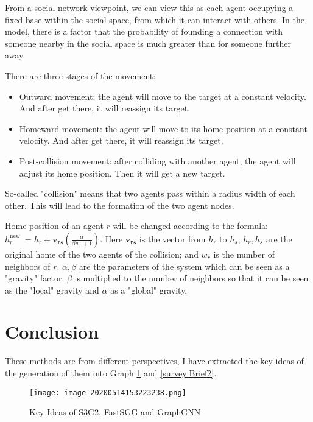 \begin{survey}
From a social network viewpoint, we can view this as each agent
occupying a fixed base within the social space, from which it can
interact with others. In the model, there is a factor that the
probability of founding a connection with someone nearby in the social
space is much greater than for someone further away.

There are three stages of the movement:

\begin{itemize}
\item
  Outward movement: the agent will move to the target at a constant
  velocity. And after get there, it will reassign its target.
\item
  Homeward movement: the agent will move to its home position at a
  constant velocity. And after get there, it will reassign its target.
\item
  Post-collision movement: after colliding with another agent, the agent
  will adjust its home position. Then it will get a new target.
\end{itemize}

\vspace{0.2cm}

So-called "collision" means that two agents pass within a radius width
of each other. This will lead to the formation of the two agent nodes.

Home position of an agent \(r\) will be changed according to the
formula:
\(h_{r}^{\text {new }}=h_{r}+\boldsymbol{v}_{\boldsymbol{r s}}\left(\frac{\alpha}{\beta w_{r}+1}\right)\).
Here \(\boldsymbol{v}_{\boldsymbol{r s}}\) is the vector from \(h_r\) to
\(h_s\); \(h_r, h_s\) are the original home of the two agents of the
collision; and \(w_r\) is the number of neighbors of \(r\).
\(\alpha, \beta\) are the parameters of the system which can be seen as
a "gravity" factor. \(\beta\) is multiplied to the number of neighbors
so that it can be seen as the "local" gravity and \(\alpha\) as a
"global" gravity.

\section{Conclusion}

These methods are from different perspectives, I have extracted the key
ideas of the generation of them into Graph \ref{survey:Brief1} and \ref{survey:Brief2}.

\begin{figure}
  \centering
  \texttt{[image: image-20200514153223238.png]}
  \caption*{Key Ideas of S3G2, FastSGG and GraphGNN}
  \label{survey:Brief1}
\end{figure}


\end{survey}
